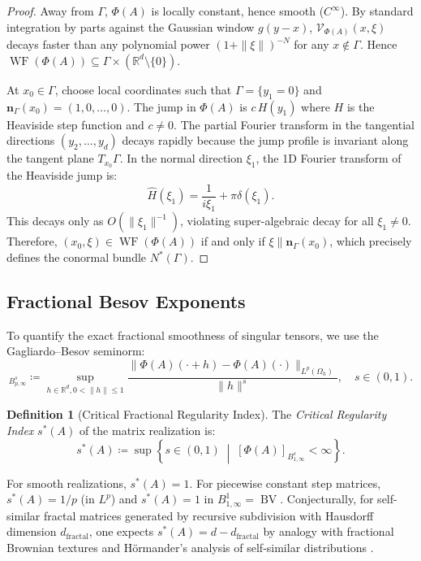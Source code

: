 \documentclass[11pt,a4paper,reqno]{amsart}
\theoremstyle{definition}
\newtheorem{definition}[theorem]{Definition}
\numberwithin{equation}{section}
\newcommand{\R}{\mathbb{R}}
\newcommand{\BV}{\operatorname{BV}}
\newcommand{\WF}{\operatorname{WF}}
\begin{document}
\begin{proof}
Away from $\Gamma$, $\Phi(A)$ is locally constant, hence smooth ($C^\infty$). By standard integration by parts against the Gaussian window $g(y - x)$, $\mathcal{V}_{\Phi(A)}(x, \xi)$ decays faster than any polynomial power $(1 + \|\xi\|)^{-N}$ for any $x \notin \Gamma$. Hence $\WF(\Phi(A)) \subseteq \Gamma \times (\R^d \setminus \{0\})$.

At $x_0 \in \Gamma$, choose local coordinates such that $\Gamma = \{y_1 = 0\}$ and $\mathbf{n}_\Gamma(x_0) = (1, 0, \dots, 0)$. The jump in $\Phi(A)$ is $c \, H(y_1)$ where $H$ is the Heaviside step function and $c \ne 0$. The partial Fourier transform in the tangential directions $(y_2, \dots, y_d)$ decays rapidly because the jump profile is invariant along the tangent plane $T_{x_0}\Gamma$. In the normal direction $\xi_1$, the 1D Fourier transform of the Heaviside jump is:
\begin{equation}
    \widehat{H}(\xi_1) = \frac{1}{i \xi_1} + \pi \delta(\xi_1).
\end{equation}
This decays only as $O(\|\xi_1\|^{-1})$, violating super-algebraic decay for all $\xi_1 \ne 0$. Therefore, $(x_0, \xi) \in \WF(\Phi(A))$ if and only if $\xi \parallel \mathbf{n}_\Gamma(x_0)$, which precisely defines the conormal bundle $N^*(\Gamma)$.
\end{proof}

\subsection{Fractional Besov Exponents}
To quantify the exact fractional smoothness of singular tensors, we use the Gagliardo--Besov seminorm:
\begin{equation}
    [\Phi(A)]_{B^s_{p,\infty}} \coloneqq \sup_{h \in \R^d, 0 < \|h\| \le 1} \frac{\|\Phi(A)(\cdot + h) - \Phi(A)(\cdot)\|_{L^p(\Omega_h)}}{\|h\|^s}, \quad s \in (0, 1).
\end{equation}

\begin{definition}[Critical Fractional Regularity Index]
The \emph{Critical Regularity Index} $s^*(A)$ of the matrix realization is:
\begin{equation}
    s^*(A) \coloneqq \sup \left\{ s \in (0, 1) \;\middle|\; [\Phi(A)]_{B^s_{1,\infty}} < \infty \right\}.
\end{equation}
\end{definition}
For smooth realizations, $s^*(A) = 1$. For piecewise constant step matrices, $s^*(A) = 1/p$ (in $L^p$) and $s^*(A) = 1$ in $B^1_{1,\infty} = \BV$. Conjecturally, for self-similar fractal matrices generated by recursive subdivision with Hausdorff dimension $d_{\mathrm{fractal}}$, one expects $s^*(A) = d - d_{\mathrm{fractal}}$ by analogy with fractional Brownian textures and Hörmander's analysis of self-similar distributions \cite{hormander2003analysis}.
\end{document}
